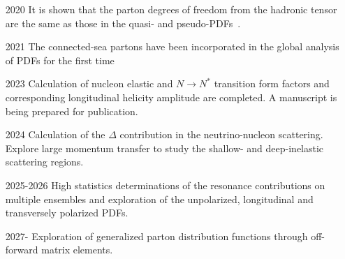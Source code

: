 \documentclass[prd,showpacs,showkeys,preprintnumbers,floatfix,
nofootinbib%
]{revtex4-2}
\begin{document}
\begin{itemize}
    \item[2020] It is shown that the parton degrees of freedom from the hadronic tensor are the same as those in the quasi- and pseudo-PDFs~\cite{Liu:2020okp}.
    \item[2021] The connected-sea partons have been incorporated in the global analysis of PDFs for the first time~\cite{Hou:2022ajg}
    \item[2023] Calculation of nucleon elastic and $N\to N^*$ transition form factors and corresponding longitudinal helicity amplitude are completed. A manuscript is being prepared for publication.
    \item[2024] Calculation of the $\Delta$ contribution in the neutrino-nucleon scattering. Explore large momentum transfer
    to study the shallow- and deep-inelastic scattering regions.
    \item[2025-2026] High statistics determinations of the resonance contributions on multiple ensembles and exploration of
    the unpolarized, longitudinal and transversely polarized PDFs.
    \item[2027-] Exploration of generalized parton distribution functions through off-forward matrix elements.
\end{itemize}

\end{document}
